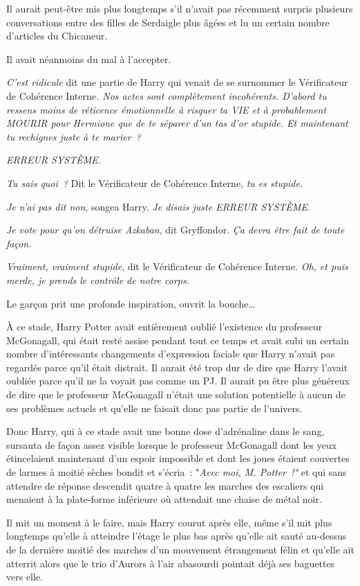 Il aurait peut-être mis plus longtemps s'il n'avait pas récemment surpris plusieurs conversations entre des filles de Serdaigle plus âgées et lu un certain nombre d'articles du Chicaneur.

Il avait néanmoins du mal à l'accepter.

\emph{C'est ridicule} dit une partie de Harry qui venait de se surnommer le Vérificateur de Cohérence Interne\emph{. Nos actes sont complètement incohérents. D'abord tu ressens moins de réticence émotionnelle à risquer ta VIE et à probablement MOURIR pour Hermione que de te séparer d'un tas d'or stupide. Et maintenant tu rechignes juste à te marier~?}

\emph{ERREUR SYSTÈME.}

\emph{Tu sais quoi~?} Dit le Vérificateur de Cohérence Interne, \emph{tu es stupide.}

\emph{Je n'ai pas dit non}, songea Harry. \emph{Je disais juste ERREUR SYSTÈME.}

\emph{Je vote pour qu'on détruise Azkaban}, dit Gryffondor. \emph{Ça devra être fait de toute façon.}

\emph{Vraiment, vraiment stupide}, dit le Vérificateur de Cohérence Interne. \emph{Oh, et puis merde, je prends le contrôle de notre corps.}

Le garçon prit une profonde inspiration, ouvrit la bouche…

À ce stade, Harry Potter avait entièrement oublié l'existence du professeur McGonagall, qui était resté assise pendant tout ce temps et avait subi un certain nombre d'intéressants changements d'expression faciale que Harry n'avait pas regardés parce qu'il était distrait. Il aurait été trop dur de dire que Harry l'avait oubliée parce qu'il ne la voyait pas comme un PJ. Il aurait pu être plus généreux de dire que le professeur McGonagall n'était une solution potentielle à aucun de ses problèmes actuels et qu'elle ne faisait donc pas partie de l'univers.

Donc Harry, qui à ce stade avait une bonne dose d'adrénaline dans le sang, sursauta de façon assez visible lorsque le professeur McGonagall dont les yeux étincelaient maintenant d'un espoir impossible et dont les joues étaient couvertes de larmes à moitié sèches bondit et s'écria~: "\emph{Avec moi, M. Potter~!"} et qui sans attendre de réponse descendit quatre à quatre les marches des escaliers qui menaient à la plate-forme inférieure où attendait une chaise de métal noir.

Il mit un moment à le faire, mais Harry courut après elle, même s'il mit plus longtemps qu'elle à atteindre l'étage le plus bas après qu'elle ait sauté au-dessus de la dernière moitié des marches d'un mouvement étrangement félin et qu'elle ait atterrit alors que le trio d'Aurors à l'air abasourdi pointait déjà ses baguettes vers elle.

